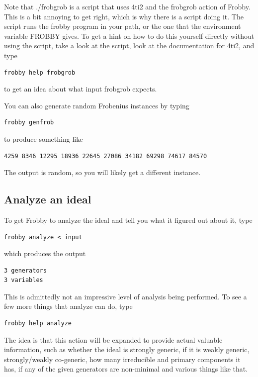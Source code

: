 \documentclass{amsart}
\theoremstyle{definition}
\begin{document}
Note that ./frobgrob is a script that uses 4ti2 and the frobgrob
action of Frobby. This is a bit annoying to get right, which is why
there is a script doing it. The script runs the frobby program in your
path, or the one that the environment variable FROBBY gives. To get a
hint on how to do this yourself directly without using the script,
take a look at the script, look at the documentation for 4ti2, and
type
\begin{verbatim}
frobby help frobgrob
\end{verbatim}
to get an idea about what input frobgrob expects.

You can also generate random Frobenius instances by typing
\begin{verbatim}
frobby genfrob
\end{verbatim}
to produce something like
\begin{verbatim}
4259 8346 12295 18936 22645 27086 34182 69298 74617 84570
\end{verbatim}
The output is random, so you will likely get a different instance.

\subsection{Analyze an ideal}

To get Frobby to analyze the ideal and tell you what it figured out
about it, type
\begin{verbatim}
frobby analyze < input
\end{verbatim}
which produces the output
\begin{verbatim}
3 generators
3 variables
\end{verbatim}
This is admittedly not an impressive level of analysis being
performed. To see a few more things that analyze can do, type
\begin{verbatim}
frobby help analyze
\end{verbatim}
The idea is that this action will be expanded to provide actual
valuable information, such as whether the ideal is strongly generic,
if it is weakly generic, strongly/weakly co-generic, how many
irreducible and primary components it has, if any of the given
generators are non-minimal and various things like that.
\begin{verbatim}
\end{verbatim}
\end{document}
